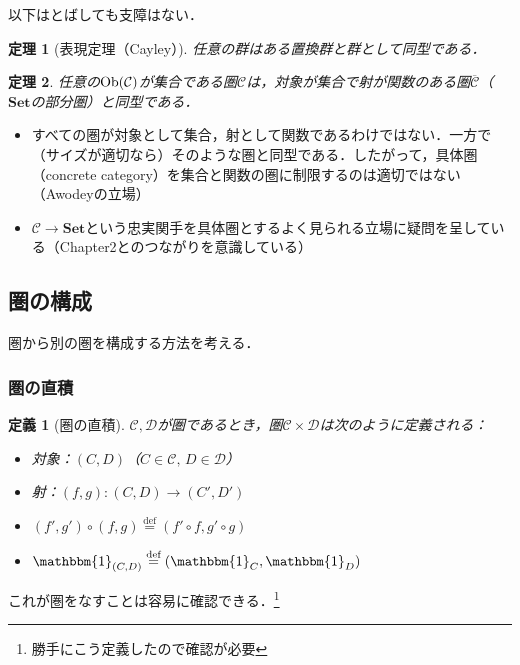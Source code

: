 \documentclass[dvipdfmx,a4j,10pt]{jsarticle}
\theoremstyle{mystyle1}
\theoremstyle{mystyle2}
\newtheorem{dfn*}{定義}
\newtheorem{thm*}{定理}
\theoremstyle{mystyle3}
\newcommand*{\defeq}{\stackrel{\text{def}}{=}}
\newcommand{\Ob}{{\rm Ob}}
\begin{document}
    以下はとばしても支障はない．
    \begin{thm*}[表現定理（Cayley）]
        任意の群はある置換群と群として同型である．
    \end{thm*}

    \begin{thm*}
        任意の$\Ob(\mathcal{C})$が集合である圏$\mathcal{C}$は，対象が集合で射が関数のある圏$\overline{\mathcal{C}}$（$\mathbf{Set}$の部分圏）と同型である．
    \end{thm*}

    \begin{itemize}
        \item すべての圏が対象として集合，射として関数であるわけではない．一方で（サイズが適切なら）そのような圏と同型である．したがって，具体圏（concrete category）を集合と関数の圏に制限するのは適切ではない（Awodeyの立場）
        \item $\mathcal{C}\to\mathbf{Set}$という忠実関手を具体圏とするよく見られる立場に疑問を呈している（Chapter2とのつながりを意識している）
    \end{itemize}

    \subsection{圏の構成}

    圏から別の圏を構成する方法を考える．

    \subsubsection{圏の直積}

    \begin{dfn*}[圏の直積]
        $\mathcal{C},\mathcal{D}$が圏であるとき，圏$\mathcal{C}\times\mathcal{D}$は次のように定義される：
        \begin{itemize}
            \item 対象：$(C,D)$（$C\in\mathcal{C},\, D\in\mathcal{D}$）
            \item 射：$(f,g):(C,D)\to(C',D')$
            \item $(f',g')\circ(f,g)\defeq(f'\circ f,g'\circ g)$
            \item $\mathbbm{1}_{(C,D)}\defeq(\mathbbm{1}_C,\mathbbm{1}_D)$
        \end{itemize}
    \end{dfn*}

    これが圏をなすことは容易に確認できる．\footnote{勝手にこう定義したので確認が必要}
\end{document}
